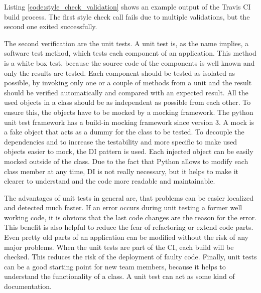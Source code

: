 Listing \ref{code:style_check_validation} shows an example output of the Travis \ac{CI} build process.
The first style check call fails due to multiple validations, but the second one exited successfully.\newline

The second verification are the unit tests.
A unit test is, as the name implies, a software test method, which tests each component of an application.
This method is a white box test, because the source code of the components is well known and only the results are tested.
Each component should be tested as isolated as possible, by invoking only one or a couple of methods from a unit and the result should be verified automatically and compared with an expected result.\autocite[cf.][p. 320]{Olan:2003:UTT}
All the used objects in a class should be as independent as possible from each other.
To ensure this, the objects have to be mocked by a mocking framework.
The python unit test framework has a build-in mocking framework since version 3.
A mock is a fake object that acts as a dummy for the class to be tested.
To decouple the dependencies and to increase the testability and more specific to make used objects easier to mock, the \ac{DI} pattern is used.
Each injected object can be easily mocked outside of the class.
Due to the fact that Python allows to modify each class member at any time, \ac{DI} is not really necessary, but it helps to make it clearer to understand and the code more readable and maintainable.\newline

The advantages of unit tests in general are, that problems can be easier localized and detected much faster.
If an error occurs during unit testing a former well working code, it is obvious that the last code changes are the reason for the error.
This benefit is also helpful to reduce the fear of refactoring or extend code parts.
Even pretty old parts of an application can be modified without the risk of any major problems.
When the unit tests are part of the \ac{CI}, each build will be checked.
This reduces the risk of the deployment of faulty code.
Finally, unit tests can be a good starting point for new team members, because it helps to understand the functionality of a class.
A unit test can act as some kind of documentation.\newline

